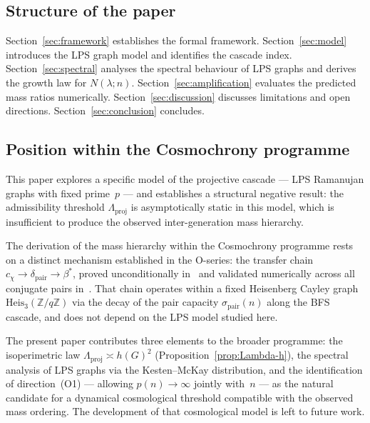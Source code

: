   \subsection{Structure of the paper}
    \label{sec:intro:structure}

    Section~\ref{sec:framework} establishes the formal framework.
    Section~\ref{sec:model} introduces the LPS graph model and identifies the
    cascade index.
    Section~\ref{sec:spectral} analyses the spectral behaviour of LPS graphs and
    derives the growth law for $N(\lambda; n)$.
    Section~\ref{sec:amplification} evaluates the predicted mass ratios numerically.
    Section~\ref{sec:discussion} discusses limitations and open directions.
    Section~\ref{sec:conclusion} concludes.

  \subsection{Position within the Cosmochrony programme}
    \label{sec:intro:position}

    This paper explores a specific model of the projective cascade --- LPS Ramanujan
    graphs with fixed prime~$p$ --- and establishes a structural negative result:
    the admissibility threshold $\Lambda_{\mathrm{proj}}$ is asymptotically static
    in this model, which is insufficient to produce the observed inter-generation
    mass hierarchy.

    The derivation of the mass hierarchy within the Cosmochrony programme rests on
    a distinct mechanism established in the O-series: the transfer chain
    $c_\chi \to \delta_{\mathrm{pair}} \to \beta^*$, proved unconditionally
    in~\cite{Beau2026a28} and validated numerically across all conjugate pairs
    in~\cite{Beau2026a29}.
    That chain operates within a fixed Heisenberg Cayley graph
    $\mathrm{Heis}_3(\mathbb{Z}/q\mathbb{Z})$ via the decay of the pair capacity
    $\sigma_{\mathrm{pair}}(n)$ along the BFS cascade, and does not depend on the
    LPS model studied here.

    The present paper contributes three elements to the broader programme:
    the isoperimetric law $\Lambda_{\mathrm{proj}} \asymp h(G)^2$
    (Proposition~\ref{prop:Lambda-h}), the spectral analysis of LPS graphs via the
    Kesten--McKay distribution, and the identification of direction~(O1) ---
    allowing $p(n) \to \infty$ jointly with~$n$ --- as the natural candidate for a
    dynamical cosmological threshold compatible with the observed mass ordering.
    The development of that cosmological model is left to future work.

